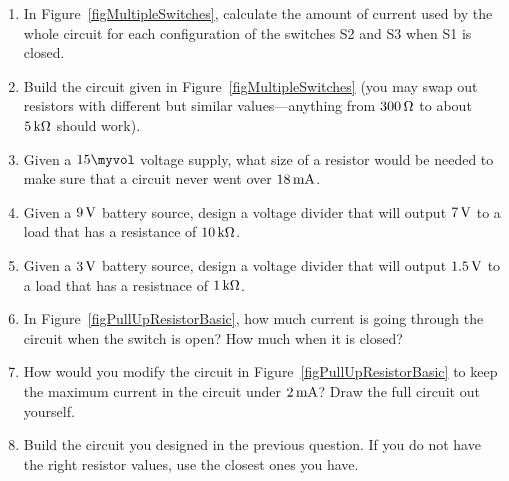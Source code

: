 \applysection

\begin{enumerate}
\item In Figure~\ref{figMultipleSwitches}, calculate the amount of current used by the whole circuit for each configuration of the switches S2 and S3 when S1 is closed.
\item Build the circuit given in Figure~\ref{figMultipleSwitches} (you may swap out resistors with different but similar values---anything from $300\,\si{\ohm}$ to about $5\,\si{\kilo\ohm}$ should work).
\item Given a $15\myvol$ voltage supply, what size of a resistor would be needed to make sure that a circuit never went over $18\,\si{\milli\ampere}$.
\item Given a $9\,\si{\volt}$ battery source, design a voltage divider that will output $7\,\si{\volt}$ to a load that has a resistance of $10\,\si{\kilo\ohm}$.
\item Given a $3\,\si{\volt}$ battery source, design a voltage divider that will output $1.5\,\si{\volt}$ to a load that has a resistnace of $1\,\si{\kilo\ohm}$.
\item In Figure~\ref{figPullUpResistorBasic}, how much current is going through the circuit when the switch is open?  How much when it is closed?
\item How would you modify the circuit in Figure~\ref{figPullUpResistorBasic} to keep the maximum current in the circuit under $2\,\si{\milli\ampere}$?  Draw the full circuit out yourself.
\item Build the circuit you designed in the previous question.  If you do not have the right resistor values, use the closest ones you have.
\end{enumerate}
